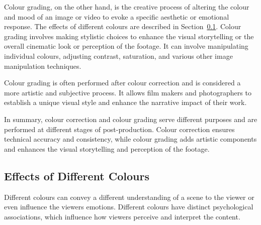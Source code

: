 \documentclass[../MasterThesis.tex]{subfiles}
\begin{document}
Colour grading, on the other hand, is the creative process of altering the colour and mood of an image or video to evoke a specific aesthetic or emotional response. The effects of different colours are described in Section~\ref{subsection:effectsofdifferentcolours}.
Colour grading involves making stylistic choices to enhance the visual storytelling or the overall cinematic look or perception of the footage. It can involve manipulating individual colours, adjusting contrast, saturation, and various other image manipulation techniques.~\cite{cc_cg_1, cc_cg_2}

Colour grading is often performed after colour correction and is considered a more artistic and subjective process. It allows film makers and photographers to establish a unique visual style and enhance the narrative impact of their work.~\cite{cc_cg_1, cc_cg_2}


In summary, colour correction and colour grading serve different purposes and are performed at different stages of post-production. Colour correction ensures technical accuracy and consistency, while colour grading adds artistic components and enhances the visual storytelling and perception of the footage.~\cite{cc1, cc_cg_1, cc_cg_2}


















\newpage
\subsection{Effects of Different Colours} 
\label{subsection:effectsofdifferentcolours}

Different colours can convey a different understanding of a scene to the viewer or even influence the viewers emotions. 
Different colours have distinct psychological associations, which influence how viewers perceive and interpret the content.~\cite{colour,colour2}
\end{document}

